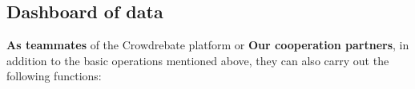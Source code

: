\subsection{Dashboard of data}

\textbf{As teammates} of the Crowdrebate platform or \textbf{Our cooperation partners}, in addition to the basic operations mentioned above, they can also carry out the following functions:

\begin{figure}[t!] \vspace{1ex}
\end{figure}
